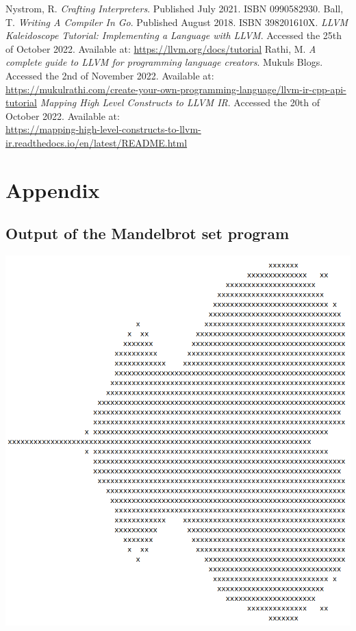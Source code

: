 ﻿\documentclass[10pt,a4paper,twocolumn,twoside]{article}
\begin{document}
\renewcommand\refname{Bibliography}
\begin{thebibliography}{11}
 Nystrom, R. \textit{Crafting Interpreters}. Published July 2021. ISBN 0990582930.
 Ball, T. \textit{Writing A Compiler In Go}. Published August 2018. ISBN 398201610X.
 \textit{LLVM Kaleidoscope Tutorial: Implementing a Language with LLVM}. Accessed the 25th of October 2022. Available at: \url{https://llvm.org/docs/tutorial}
 Rathi, M. \textit{A complete guide to LLVM for programming language creators}. Mukuls Blogs. Accessed the 2nd of November 2022. Available at: \\\url{https://mukulrathi.com/create-your-own-programming-language/llvm-ir-cpp-api-tutorial}
 \textit{Mapping High Level Constructs to LLVM IR}. Accessed the 20th of October 2022. Available at: \\\url{https://mapping-high-level-constructs-to-llvm-ir.readthedocs.io/en/latest/README.html}
\end{thebibliography}

\newpage
\appendix

\section*{Appendix}

\setcounter{section}{1}

\subsection{Output of the Mandelbrot set program}
\label{appendix:a}
\includegraphics[width=\linewidth]{mandelbrot}
\end{document}
